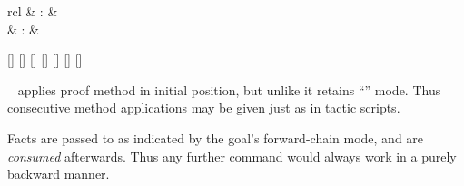 \begin{isabellebody}
\begin{isamarkuptext}
\begin{matharray}{rcl}
    \hypertarget{command.prefer}{\hyperlink{command.prefer}{\mbox{}}} & : &  \\
    \hypertarget{command.back}{\hyperlink{command.back}{\mbox{}}} & : &  \\
  \end{matharray}

  \begin{railoutput}
\rail@bar
{}[]
[]
\rail@endbar
{}[]
\rail@end
{}
[]
\rail@bar
{}
[]
\rail@endbar
\rail@end
{}
[]
[]
\rail@end
\end{railoutput}


  \begin{description}

  \item \hyperlink{command.apply}{\mbox{}}~ applies proof method  in
  initial position, but unlike \hyperlink{command.proof}{\mbox{}} it retains ``'' mode.  Thus consecutive method applications may be
  given just as in tactic scripts.
  
  Facts are passed to  as indicated by the goal's
  forward-chain mode, and are \emph{consumed} afterwards.  Thus any
  further \hyperlink{command.apply}{\mbox{}} command would always work in a purely
  backward manner.
  

\end{description}
\end{isamarkuptext}
\end{isabellebody}
